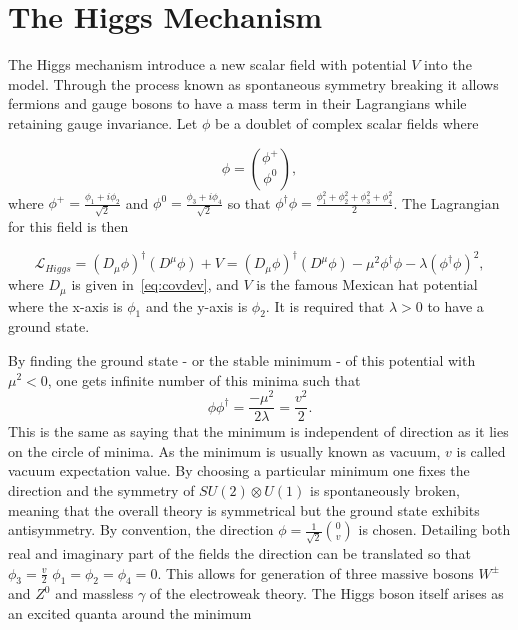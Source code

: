 \section{The Higgs Mechanism}
\label{higgs}
The Higgs mechanism introduce a new scalar field with potential $V$ into the model. Through the process known as spontaneous symmetry breaking it allows fermions and gauge bosons to have a mass term in their Lagrangians while retaining gauge invariance. Let $\phi$ be a doublet of complex scalar fields where

\begin{equation}
\phi = \binom{\phi^{+}}{\phi^{0}},
\end{equation}
where $\phi^{+} = \frac{\phi_{1} + i{\phi_{2}}}{\sqrt{2}}$ and $\phi^{0} = \frac{\phi_{3} + i{\phi_{4}}}{\sqrt{2}}$ so that $\phi^{\dagger}\phi = \frac{\phi_{1}^{2} + \phi_{2}^{2} + \phi_{3}^{2} + \phi_{4}^{2}}{2}$.  The Lagrangian for this field is then

\begin{equation}
	\mathcal{L}_{Higgs} = (D_{\mu}\phi)^{\dagger}(D^{\mu}\phi) + V = (D_{\mu}\phi)^{\dagger}(D^{\mu}\phi) - \mu^{2}\phi^{\dagger}\phi - \lambda (\phi^{\dagger}\phi)^{2},
\end{equation}
where $D_{\mu}$ is given in~\autoref{eq:covdev}, and $V$ is the famous Mexican hat potential where the x-axis is $\phi_{1}$ and the y-axis is $\phi_{2}$. It is required that $\lambda>0$ to have a ground state.

By finding the ground state - or the stable minimum - of this potential with $\mu^{2}<0$, one gets infinite number of this minima such that
\begin{equation}
	\phi\phi^{\dagger}=\frac{-\mu^{2}}{2\lambda}=\frac{v^{2}}{2}.
\end{equation}
This is the same as saying that the minimum is independent of direction as it lies on the circle of minima. As the minimum is usually known as vacuum, $v$ is called vacuum expectation value. By choosing a particular minimum one fixes the direction and the symmetry of $SU(2)\otimes U(1)$ is spontaneously broken, meaning that the overall theory is symmetrical but the ground state exhibits antisymmetry. By convention, the direction $\phi=\frac{1}{\sqrt{2}}\binom{0}{v}$ is chosen. Detailing both real and imaginary part of the fields the direction can be translated so that $\phi_{3}=\frac{v}{2}$ $\phi_{1}=\phi_{2}=\phi_{4}=0$. This allows for generation of three massive bosons $W^{\pm}$ and $Z^{0}$ and massless $\gamma$ of the electroweak theory. The Higgs boson itself arises as an excited quanta around the minimum 

